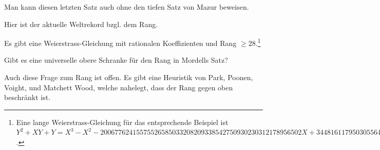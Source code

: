 Man kann diesen letzten Satz auch ohne den tiefen Satz von Mazur beweisen.

Hier ist der aktuelle Weltrekord bzgl. dem Rang.

\begin{satz}[Elkies (2006)]
  Es gibt eine Weierstrass-Gleichung mit rationalen Koeffizienten und
  Rang $\ge 28$.\footnote{
Eine lange Weierstrass-Gleichung für das entsprechende Beispiel ist
$Y^2 + XY + Y = X^3 - X^2 -
20067762415575526585033208209338542750930230312178956502X +
34481611795030556467032985690390720374855944359319180361266008296291939448732243429$. }
\end{satz}

\begin{frage}
  Gibt es eine universelle obere Schranke für den Rang in Mordells Satz?
\end{frage}

Auch diese Frage zum Rang ist offen. Es gibt eine Heuristik von Park,
Poonen, Voight, und Matchett Wood, welche nahelegt, dass der Rang
gegen oben beschränkt ist.





